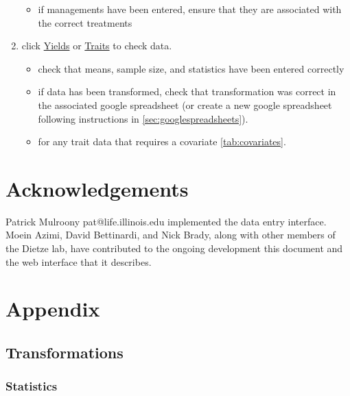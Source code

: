 \documentclass[12pt,english,portrait]{article}
\begin{document}
\begin{enumerate}
\begin{itemize}
   \item if managements have been entered, ensure that they are associated with the correct treatments
   \end{itemize}
 \item click \href{http://ebi-forecast.igb.uiuc.edu/bety/yields/}{Yields} or \href{http://ebi-forecast.igb.uiuc.edu/bety/traits/}{Traits} to check data.
   \begin{itemize}
   \item check that means, sample size, and statistics have been entered correctly
   \item if data has been transformed, check that transformation was correct in the associated google spreadsheet (or create a new google spreadsheet following instructions in \autoref{sec:googlespreadsheets}).
   \item for any trait data that requires a covariate \autoref{tab:covariates}.
   \end{itemize}

 \end{enumerate}



\section{Acknowledgements}

 Patrick Mulroony pat@life.illinois.edu implemented the data entry interface.
 Moein Azimi, David Bettinardi, and Nick Brady, along with other members of the Dietze lab, have contributed to the ongoing development this document and the web interface that it describes.
 
\section{Appendix}


\subsection{Transformations}

\subsubsection{Statistics}
\end{document}
